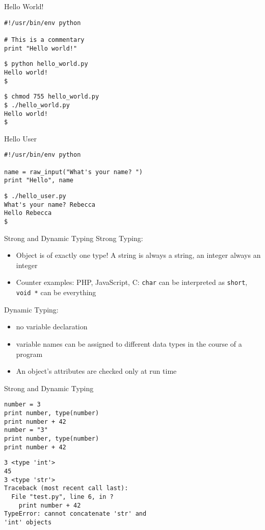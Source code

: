 \begin{frame}[fragile]{Hello World!}
\begin{lstlisting}[style=Python]
#!/usr/bin/env python

# This is a commentary
print "Hello world!"
\end{lstlisting}
\begin{lstlisting}[style=Shell]
$ python hello_world.py
Hello world!
$
\end{lstlisting}%
\begin{lstlisting}[style=Shell]
$ chmod 755 hello_world.py
$ ./hello_world.py
Hello world!
$
\end{lstlisting} %
\end{frame}

\begin{frame}[fragile]{Hello User}
\begin{lstlisting}[style=Python]
#!/usr/bin/env python

name = raw_input("What's your name? ")
print "Hello", name
\end{lstlisting}
\begin{lstlisting}[style=Shell]
$ ./hello_user.py
What's your name? Rebecca
Hello Rebecca
$
\end{lstlisting}
\end{frame}

\begin{frame}{Strong and Dynamic Typing}
\alert{Strong Typing:}
\begin{itemize}
\item Object is of exactly one type! A string is always a string, an integer always an integer
\item Counter examples: PHP, JavaScript, C: \texttt{char} can be interpreted as \texttt{short}, \texttt{void~*} can be everything
\end{itemize}
\alert{Dynamic Typing:}
\begin{itemize}
\item no variable declaration
\item variable names can be assigned to different data types in the course of a program
\item An object's attributes are checked only at run time
\end{itemize}
\end{frame}

\begin{frame}[fragile]{Strong and Dynamic Typing}
\begin{lstlisting}[style=Python]
number = 3
print number, type(number)
print number + 42
number = "3"
print number, type(number)
print number + 42
\end{lstlisting}
\begin{lstlisting}[style=Shell]
3 <type 'int'>
45
3 <type 'str'>
Traceback (most recent call last):
  File "test.py", line 6, in ?
    print number + 42
TypeError: cannot concatenate 'str' and 
'int' objects
\end{lstlisting}
\end{frame}

